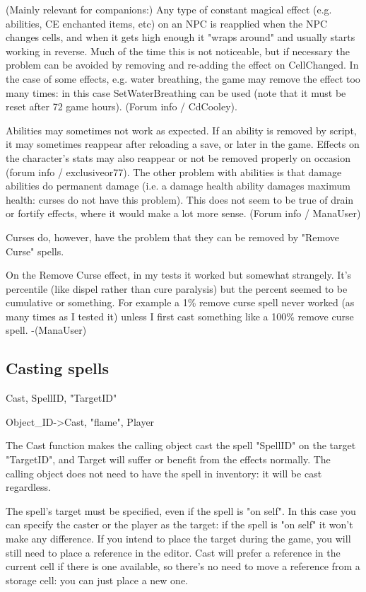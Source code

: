 \documentclass[
]{article}
\begin{document}
(Mainly relevant for companions:) Any type of constant magical effect
(e.g. abilities, CE enchanted items, etc) on an NPC is reapplied when
the NPC changes cells, and when it gets high enough it "wraps around"
and usually starts working in reverse. Much of the time this is not
noticeable, but if necessary the problem can be avoided by removing and
re-adding the effect on CellChanged. In the case of some effects, e.g.
water breathing, the game may remove the effect too many times: in this
case SetWaterBreathing can be used (note that it must be reset after 72
game hours). (Forum info / CdCooley).

Abilities may sometimes not work as expected. If an ability is removed
by script, it may sometimes reappear after reloading a save, or later in
the game. Effects on the character's stats may also reappear or not be
removed properly on occasion (forum info / exclusiveor77). The other
problem with abilities is that damage abilities do permanent damage
(i.e. a damage health ability damages maximum health: curses do not have
this problem). This does not seem to be true of drain or fortify
effects, where it would make a lot more sense. (Forum info / ManaUser)

Curses do, however, have the problem that they can be removed by "Remove
Curse" spells.

On the Remove Curse effect, in my tests it worked but somewhat
strangely. It's percentile (like dispel rather than cure paralysis) but
the percent seemed to be cumulative or something. For example a 1\%
remove curse spell never worked (as many times as I tested it) unless I
first cast something like a 100\% remove curse spell. -(ManaUser)

\hypertarget{casting-spells}{%
\subsection{\texorpdfstring{\hfill\break
Casting spells}{ Casting spells}}\label{casting-spells}}

Cast, SpellID, "TargetID"

Object\_ID-\textgreater Cast, "flame", Player

The Cast function makes the calling object cast the spell "SpellID" on
the target "TargetID", and Target will suffer or benefit from the
effects normally. The calling object does not need to have the spell in
inventory: it will be cast regardless.

The spell's target must be specified, even if the spell is "on self". In
this case you can specify the caster or the player as the target: if the
spell is "on self" it won't make any difference. If you intend to place
the target during the game, you will still need to place a reference in
the editor. Cast will prefer a reference in the current cell if there is
one available, so there's no need to move a reference from a storage
cell: you can just place a new one.
\end{document}
